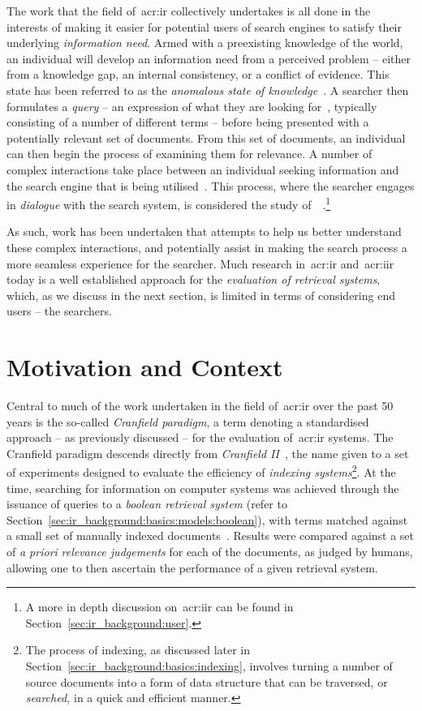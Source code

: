 The work that the field of~\gls{acr:ir} collectively undertakes is all done in the interests of making it easier for potential users of search engines to satisfy their underlying \emph{information need}. Armed with a preexisting knowledge of the world, an individual will develop an information need from a perceived problem -- either from a knowledge gap, an internal consistency, or a conflict of evidence. This state has been referred to as the \emph{anomalous state of knowledge}~\citep{belkin1980ask}. A searcher then formulates a \emph{query} -- an expression of what they are looking for~\citep{borlund2003iir_model}, typically consisting of a number of different terms -- before being presented with a potentially relevant set of documents. From this set of documents, an individual can then begin the process of examining them for relevance. A number of complex interactions take place between an individual seeking information and the search engine that is being utilised~\citep{ingwersen2005theturn}. This process, where the searcher engages in \emph{dialogue} with the search system, is considered the study of~~\citep{borlund2003iir_model}.\footnote{A more in depth discussion on~\gls{acr:iir} can be found in Section~\ref{sec:ir_background:user}.}

As such, work has been undertaken that attempts to help us better understand these complex interactions, and potentially assist in making the search process a more seamless experience for the searcher. Much research in~\gls{acr:ir} and~\gls{acr:iir} today is a well established approach for the \emph{evaluation of retrieval systems}, which, as we discuss in the next section, is limited in terms of considering end users -- the searchers.

\section{Motivation and Context}\label{sec:intro:motivation}
Central to much of the work undertaken in the field of~\gls{acr:ir} over the past 50 years is the so-called \emph{Cranfield paradigm}, a term denoting a standardised approach -- as previously discussed -- for the evaluation of~\gls{acr:ir} systems. The Cranfield paradigm descends directly from \emph{Cranfield II}~\citep{aslib1966factors}, the name given to a set of experiments designed to evaluate the efficiency of \emph{indexing systems}\footnote{The process of indexing, as discussed later in Section~\ref{sec:ir_background:basics:indexing}, involves turning a number of source documents into a form of data structure that can be traversed, or \emph{searched,} in a quick and efficient manner.}. At the time, searching for information on computer systems was achieved through the issuance of queries to a \emph{boolean retrieval system} (refer to Section~\ref{sec:ir_background:basics:models:boolean}), with terms matched against a small set of manually indexed documents~\citep{harman2010cranfield}. Results were compared against a set of \emph{a priori} \emph{relevance judgements} for each of the documents, as judged by humans, allowing one to then ascertain the performance of a given retrieval system.

